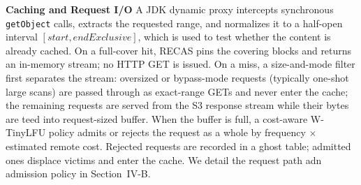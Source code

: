 \textbf{Caching and Request I/O} A JDK dynamic proxy intercepts synchronous \texttt{getObject} calls, extracts the requested range, and normalizes it to a half-open interval $[start, endExclusive]$, which is used to test whether the content is already cached. On a full-cover hit, RECAS pins the covering blocks and returns an in-memory stream; no HTTP GET is issued. On a miss, a size-and-mode filter first separates the stream: oversized or bypass-mode requests (typically one-shot large scans) are passed through as exact-range GETs and never enter the cache; the remaining requests are served from the S3 response stream while their bytes are teed into request-sized buffer. When the buffer is full, a cost-aware W-TinyLFU policy admits or rejects the request as a whole by frequency $\times$ estimated remote cost. Rejected requests are recorded in a ghost table; admitted ones displace victims and enter the cache. We detail the request path adn admission policy in Section~IV-B.

